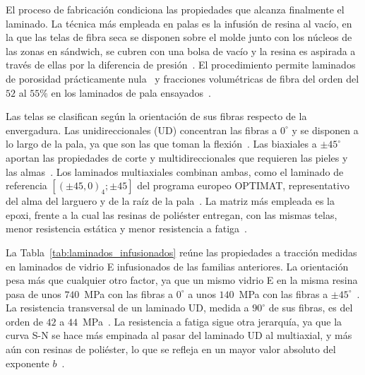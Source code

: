 El proceso de fabricación condiciona las propiedades que alcanza finalmente el laminado. La técnica más empleada en palas es la infusión de resina al vacío, en la que las telas de fibra seca se disponen sobre el molde junto con los núcleos de las zonas en sándwich, se cubren con una bolsa de vacío y la resina es aspirada a través de ellas por la diferencia de presión~\parencite{Mishnaevsky2017}. El procedimiento permite laminados de porosidad prácticamente nula~\parencite{Arwood2023} y fracciones volumétricas de fibra del orden del $52$ al $55\%$ en los laminados de pala ensayados~\parencite{Samborsky2010,Nijssen2006,Arwood2023}.

Las telas se clasifican según la orientación de sus fibras respecto de la envergadura. Las unidireccionales (UD) concentran las fibras a $0^\circ$ y se disponen a lo largo de la pala, ya que son las que toman la flexión~\parencite{Mishnaevsky2017}. Las biaxiales a $\pm 45^\circ$ aportan las propiedades de corte y multidireccionales que requieren las pieles y las almas~\parencite{Samborsky2010}. Los laminados multiaxiales combinan ambas, como el laminado de referencia $[(\pm 45, 0)_4; \pm 45]$ del programa europeo OPTIMAT, representativo del alma del larguero y de la raíz de la pala~\parencite{Nijssen2006}. La matriz más empleada es la epoxi, frente a la cual las resinas de poliéster entregan, con las mismas telas, menor resistencia estática y menor resistencia a fatiga~\parencite{Samborsky2010}.

La Tabla~\ref{tab:laminados_infusionados} reúne las propiedades a tracción medidas en laminados de vidrio E infusionados de las familias anteriores. La orientación pesa más que cualquier otro factor, ya que un mismo vidrio E en la misma resina pasa de unos $740$~MPa con las fibras a $0^\circ$ a unos $140$~MPa con las fibras a $\pm 45^\circ$~\parencite{Arwood2023}. La resistencia transversal de un laminado UD, medida a $90^\circ$ de sus fibras, es del orden de $42$ a $44$~MPa~\parencite{Samborsky2012,Arwood2023}. La resistencia a fatiga sigue otra jerarquía, ya que la curva S-N se hace más empinada al pasar del laminado UD al multiaxial, y más aún con resinas de poliéster, lo que se refleja en un mayor valor absoluto del exponente $b$~\parencite{Samborsky2012}.

